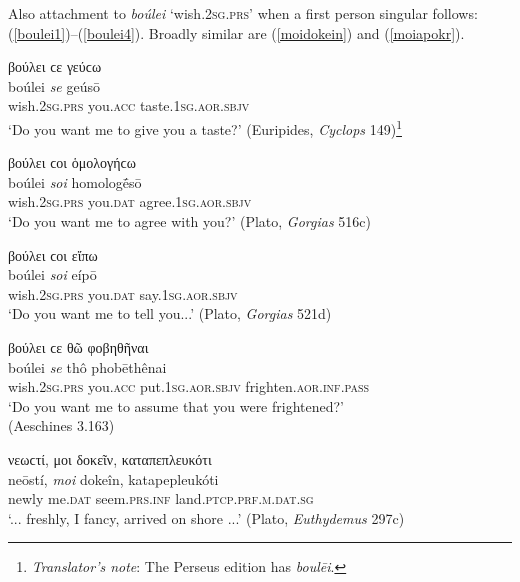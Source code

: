 Also attachment to \textit{boúlei} `wish.\textsc{2sg.prs}' when a first person singular  follows: (\ref{boulei1})--(\ref{boulei4}). Broadly similar are (\ref{moidokein}) and (\ref{moiapokr}).

\begin{exe}
\ex βούλει ϲε γεύϲω\\
\gll boúlei \emph{se} geúsō\\
wish.\textsc{2sg.prs} you.\textsc{acc} taste.\textsc{1sg.aor.sbjv}\\
\trans `Do you want me to give you a taste?' (Euripides, \textit{Cyclops} 149)\footnote{\emph{Translator's note}: The Perseus edition has  \textit{boulēi}.}
\label{boulei1}
\end{exe}

\begin{exe}
\ex βούλει ϲοι ὁμολογήϲω\\
\gll boúlei \emph{soi} homologḗsō\\
wish.\textsc{2sg.prs} you.\textsc{dat} agree.\textsc{1sg.aor.sbjv}\\
\trans `Do you want me to agree with you?' (Plato, \textit{Gorgias} 516c)
\label{boulei2}
\end{exe}

\begin{exe}
\ex βούλει ϲοι εἴπω\\
\gll boúlei \emph{soi} eípō\\
wish.\textsc{2sg.prs} you.\textsc{dat} say.\textsc{1sg.aor.sbjv}\\
\trans `Do you want me to tell you...' (Plato, \textit{Gorgias} 521d)
\label{boulei3}
\end{exe}

\begin{exe}
\ex βούλει ϲε θῶ φοβηθῆναι\\
\gll boúlei \emph{se} thô phobēthênai\\
wish.\textsc{2sg.prs} you.\textsc{acc} put.\textsc{1sg.aor.sbjv}
frighten.\textsc{aor.inf.pass}\\
\trans `Do you want me to assume that you were frightened?'\\
(Aeschines 3.163)
\label{boulei4}
\end{exe}

\begin{exe}
\ex νεωϲτί, μοι δοκεῖν, καταπεπλευκότι\\
\gll neōstí, \emph{moi} dokeîn, katapepleukóti\\
newly me.\textsc{dat} seem.\textsc{prs.inf} land.\textsc{ptcp.prf.m.dat.sg}\\
\trans `... freshly, I fancy, arrived on shore ...' (Plato, \textit{Euthydemus} 297c)
\label{moidokein}
\end{exe}

